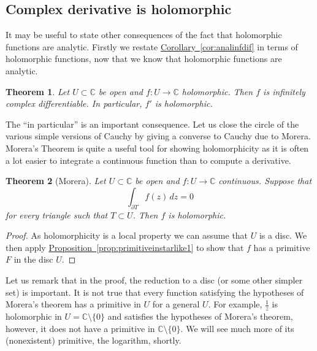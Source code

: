 \documentclass[12pt,openany]{book}
\newcommand{\C}{{\mathbb{C}}}
\theoremstyle{plain}
\newtheorem{thm}{Theorem}[section]
\theoremstyle{remark}
\theoremstyle{definition}
\theoremstyle{exercise}
\theoremstyle{example}
\newcommand{\propref}[1]{\hyperref[#1]{Proposition~\ref*{#1}}}
\newcommand{\corref}[1]{\hyperref[#1]{Corollary~\ref*{#1}}}
\begin{document}
\subsection{Complex derivative is holomorphic}

It may be useful to state other consequences of the fact that holomorphic
functions are analytic.  Firstly we restate \corref{cor:analinfdif} in terms of
holomorphic functions, now that we know that holomorphic functions are
analytic.

\begin{thm}
Let $U \subset \C$ be open and $f \colon U \to \C$ holomorphic.  Then
$f$ is infinitely complex differentiable.  In particular, $f'$ is
holomorphic.
\end{thm}

The ``in particular'' is an important consequence.  Let us close the circle
of the various simple versions of Cauchy by giving a converse to Cauchy due
to Morera.  Morera's Theorem is quite a useful tool for showing
holomorphicity as it is often a lot easier to integrate a continuous
function than to compute a derivative.

\begin{thm}[Morera] \label{thm:Morera}
Let $U \subset \C$ be open and $f \colon U \to \C$ continuous.
Suppose that
\begin{equation*}
\int_{\partial T} f(z) \, dz = 0
\end{equation*}
for every triangle such that $T \subset U$.  Then $f$ is holomorphic.
\end{thm}

\begin{proof}
As holomorphicity is a local property we can assume that $U$ is a disc.
We then apply \propref{prop:primitiveinstarlike1} to show that $f$ has
a primitive $F$ in the disc $U$.
\end{proof}

Let us remark that in the proof,
the reduction to a disc (or some other simpler set)
is important.  It is not true
that every function satisfying the hypotheses of Morera's theorem has a
primitive in $U$ for a general $U$.  For example, $\frac{1}{z}$ is
holomorphic in $U = \C \setminus \{ 0 \}$ and satisfies the hypotheses of
Morera's theorem, however, it does not have a primitive
in $\C \setminus \{ 0 \}$.  We will see much
more of its (nonexistent) primitive, the logarithm, shortly.

\end{document}
